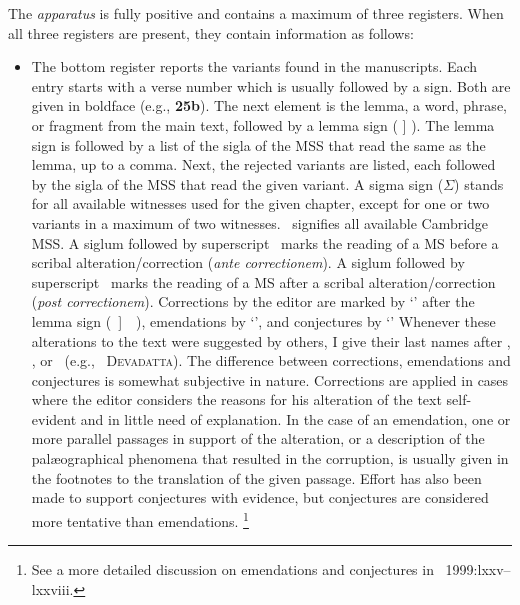 \bigskip
\noindent
The \textit{apparatus} is fully positive and contains a maximum of three registers. 
When all three registers are present, they contain information as follows:

\begin{itemize}
\item
The bottom register reports the variants found in the manuscripts.
Each entry starts with a verse number which is usually followed by a  sign.
Both are given in boldface (e.g., \textbf{25b}). The next element is the lemma, a word, phrase, or fragment from the main text,
followed by a lemma sign ( ] ). The lemma sign is followed
by a list of the sigla of the MSS that read the same as the lemma, up to a comma. 
Next, the rejected variants are listed, each followed by the sigla of the MSS that read the given variant.
A sigma sign ($\Sigma$) stands for all available witnesses used for the given chapter,
except for one or two variants in a maximum of two witnesses.
\mssCaCbCc\ signifies all available Cambridge MSS.
A siglum followed by superscript \acorr\ marks the reading of a MS before a scribal
alteration/correction (\textit{ante correctionem}).
A siglum followed by superscript \pcorr\ marks the reading of a MS after
a scribal alteration/correction (\textit{post correctionem}). 
Corrections by the editor are marked by
`\corr' after the lemma sign (~]~\corr~), emendations by `\eme', and conjectures by `\conj'
Whenever these alterations to the text were suggested by others, I give their last names after \corr,
\eme, or \conj\ (e.g., \conj\ \textsc{Devadatta}).
The difference between corrections, emendations and conjectures is somewhat subjective in nature.
Corrections are applied in cases where the editor considers the reasons for his alteration of the text self-evident and
in little need of explanation.
In the case of an emendation, %
one or more parallel passages in support of the alteration, or a description of the
pal\ae ographical phenomena that resulted in the corruption,
is usually given in the footnotes to the translation of the given passage.
Effort has also been made to support conjectures
with evidence, but conjectures are considered more tentative than emendations.%
        \footnote{See a more detailed discussion on emendations and
                conjectures in \Torzsok\ 1999:lxxv--lxxvi{i}i.}


\end{itemize}
